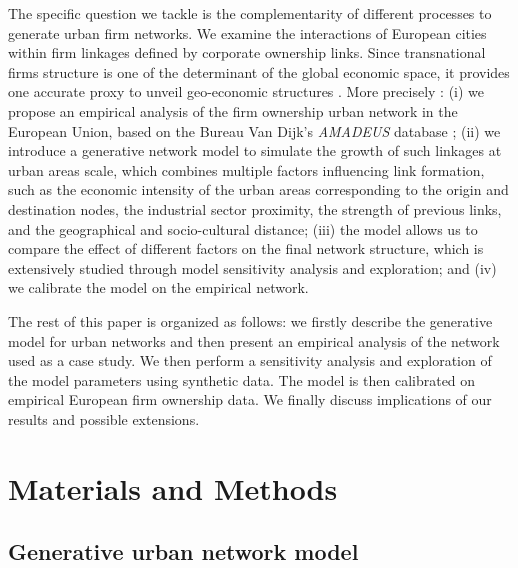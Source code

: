 \documentclass[10pt,letterpaper]{article}
\begin{document}
The specific question we tackle is the complementarity of different processes to generate urban firm networks. We examine the interactions of European cities within firm linkages defined by corporate ownership links. Since transnational firms structure is one of the determinant of the global economic space, it provides one accurate proxy to unveil geo-economic structures \cite{2020Zdanowska}. More precisely : (i) we propose an empirical analysis of the firm ownership urban network in the European Union, based on the Bureau Van Dijk's \emph {AMADEUS} database \cite{AMADEUS2018}; (ii) we introduce a generative network model to simulate the growth of such linkages at urban areas scale, which combines multiple factors influencing link formation, such as the economic intensity of the urban areas corresponding to the origin and destination nodes, the industrial sector proximity, the strength of previous links, and the geographical and socio-cultural distance; (iii) the model allows us to compare the effect of different factors on the final network structure, which is extensively studied through model sensitivity analysis and exploration; and (iv) we calibrate the model on the empirical network.

The rest of this paper is organized as follows: we firstly describe the generative model for urban networks and then present an empirical analysis of the network used as a case study. We then perform a sensitivity analysis and exploration of the model parameters using synthetic data. The model is then calibrated on empirical European firm ownership data. We finally discuss implications of our results and possible extensions.

\section*{Materials and Methods}

\subsection*{Generative urban network model}
\end{document}

